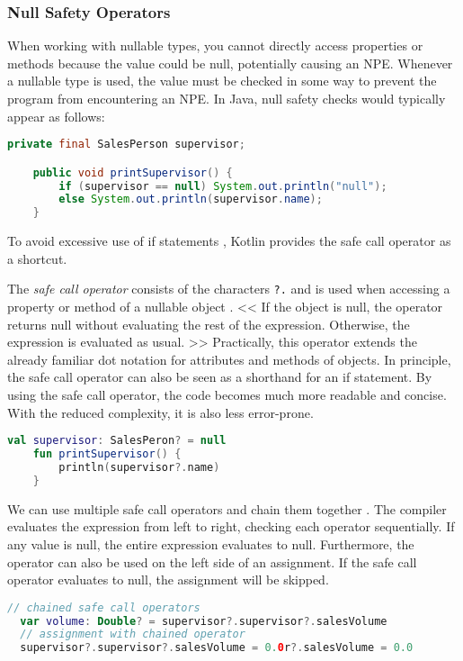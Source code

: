 \documentclass[a4paper, 11pt]{article}
\begin{document}
\subsubsection{Null Safety Operators}
  When working with nullable types, you cannot directly access properties or methods because the value could be null, potentially causing an NPE. Whenever a nullable type is used, the value must be checked in some way to prevent the program from encountering an NPE.
  In Java, null safety checks would typically appear as follows:
  \begin{lstlisting}[language=Java]
    private final SalesPerson supervisor;

    public void printSupervisor() {
        if (supervisor == null) System.out.println("null");
        else System.out.println(supervisor.name);
    }
  \end{lstlisting}
  To avoid excessive use of if statements \cite{nullsafety-if-condition}, Kotlin provides the safe call operator as a shortcut.

  The \textit{safe call operator} consists of the characters \texttt{?.} and is used when accessing a property or method of a nullable object \cite{nullsafety-safe-call}. << If the object is null, the operator returns null without evaluating the rest of the expression. Otherwise, the expression is evaluated as usual. >> Practically, this operator extends the already familiar dot notation for attributes and methods of objects. In principle, the safe call operator can also be seen as a shorthand for an if statement. By using the safe call operator, the code becomes much more readable and concise. With the reduced complexity, it is also less error-prone.
  \begin{lstlisting}[language=Kotlin]
    val supervisor: SalesPeron? = null
    fun printSupervisor() {
        println(supervisor?.name)
    }
  \end{lstlisting}
  We can use multiple safe call operators and chain them together \cite{nullsafety-safe-call}. The compiler evaluates the expression from left to right, checking each operator sequentially. If any value is null, the entire expression evaluates to null.
  Furthermore, the operator can also be used on the left side of an assignment. If the safe call operator evaluates to null, the assignment will be skipped.
  \begin{lstlisting}[language=Kotlin]
  // chained safe call operators
  var volume: Double? = supervisor?.supervisor?.salesVolume
  // assignment with chained operator
  supervisor?.supervisor?.salesVolume = 0.0r?.salesVolume = 0.0
  \end{lstlisting}
\end{document}
